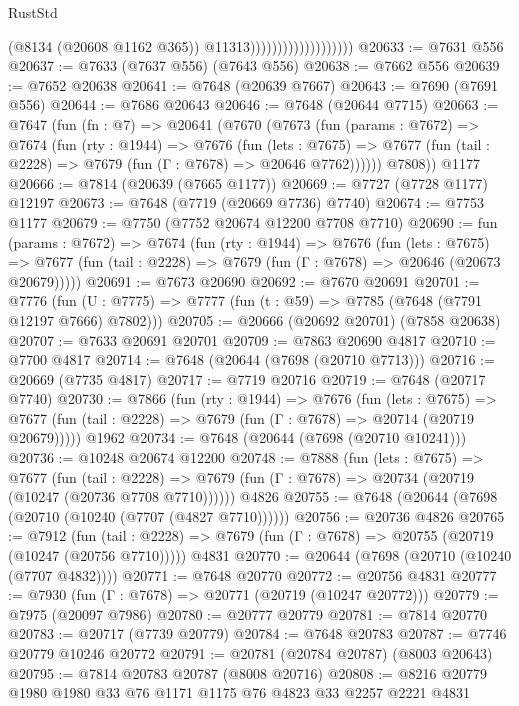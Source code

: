 \begin{lexlean}{RustStd}
\begin{coremodule}
                                          (@8134 (@20608 @1162 @365))
                                          @11313)))))))))))))))))))
@20633 := @7631 @556
@20637 := @7633 (@7637 @556) (@7643 @556)
@20638 := @7662 @556
@20639 := @7652 @20638
@20641 := @7648 (@20639 @7667)
@20643 := @7690 (@7691 @556)
@20644 := @7686 @20643
@20646 := @7648 (@20644 @7715)
@20663 := @7647
    (fun (fn : @7) =>
    @20641
      (@7670
        (@7673
          (fun (params : @7672) =>
          @7674
            (fun (rty : @1944) =>
            @7676
              (fun (lets : @7675) =>
              @7677 (fun (tail : @2228) => @7679 (fun (Γ : @7678) => @20646 @7762))))))
        @7808))
    @1177
@20666 := @7814 (@20639 (@7665 @1177))
@20669 := @7727 (@7728 @1177) @12197
@20673 := @7648 (@7719 (@20669 @7736) @7740)
@20674 := @7753 @1177
@20679 := @7750 (@7752 @20674 @12200 @7708 @7710)
@20690 := fun (params : @7672) =>
  @7674
    (fun (rty : @1944) =>
    @7676
      (fun (lets : @7675) =>
      @7677 (fun (tail : @2228) => @7679 (fun (Γ : @7678) => @20646 (@20673 @20679)))))
@20691 := @7673 @20690
@20692 := @7670 @20691
@20701 := @7776
    (fun (U : @7775) => @7777 (fun (t : @59) => @7785 (@7648 (@7791 @12197 @7666) @7802)))
@20705 := @20666 (@20692 @20701) (@7858 @20638)
@20707 := @7633 @20691 @20701
@20709 := @7863 @20690 @4817
@20710 := @7700 @4817
@20714 := @7648 (@20644 (@7698 (@20710 @7713)))
@20716 := @20669 (@7735 @4817)
@20717 := @7719 @20716
@20719 := @7648 (@20717 @7740)
@20730 := @7866
    (fun (rty : @1944) =>
    @7676
      (fun (lets : @7675) =>
      @7677 (fun (tail : @2228) => @7679 (fun (Γ : @7678) => @20714 (@20719 @20679)))))
    @1962
@20734 := @7648 (@20644 (@7698 (@20710 @10241)))
@20736 := @10248 @20674 @12200
@20748 := @7888
    (fun (lets : @7675) =>
    @7677
      (fun (tail : @2228) =>
      @7679 (fun (Γ : @7678) => @20734 (@20719 (@10247 (@20736 @7708 @7710))))))
    @4826
@20755 := @7648 (@20644 (@7698 (@20710 (@10240 (@7707 (@4827 @7710))))))
@20756 := @20736 @4826
@20765 := @7912
    (fun (tail : @2228) => @7679 (fun (Γ : @7678) => @20755 (@20719 (@10247 (@20756 @7710)))))
    @4831
@20770 := @20644 (@7698 (@20710 (@10240 (@7707 @4832))))
@20771 := @7648 @20770
@20772 := @20756 @4831
@20777 := @7930 (fun (Γ : @7678) => @20771 (@20719 (@10247 @20772)))
@20779 := @7975 (@20097 @7986)
@20780 := @20777 @20779
@20781 := @7814 @20770
@20783 := @20717 (@7739 @20779)
@20784 := @7648 @20783
@20787 := @7746 @20779 @10246 @20772
@20791 := @20781 (@20784 @20787) (@8003 @20643)
@20795 := @7814 @20783 @20787 (@8008 @20716)
@20808 := @8216 @20779 @1980 @1980 @33 @76 @1171 @1175 @76 @4823 @33 @2257 @2221 @4831

\end{coremodule}
\end{lexlean}
